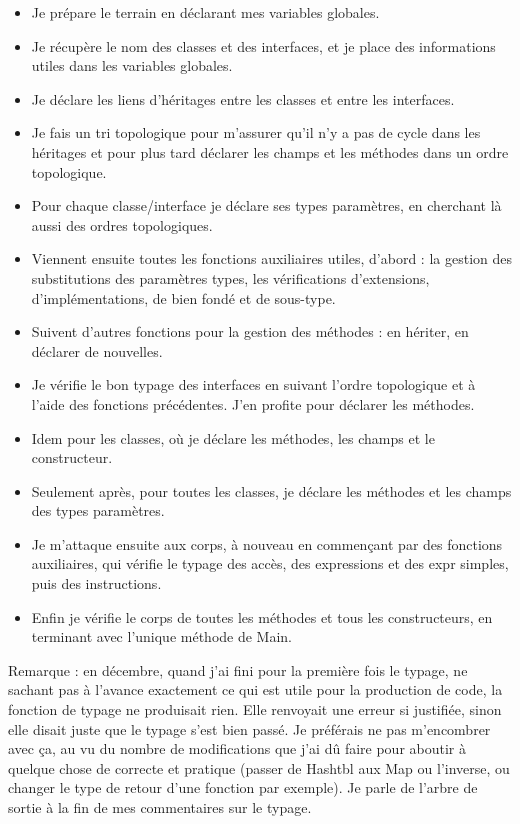 \documentclass[12pt,a4paper]{report}
\begin{document}
\begin{itemize}
\item Je prépare le terrain en déclarant mes variables globales.
\item Je récupère le nom des classes et des interfaces, et je place des informations utiles dans les variables globales.
\item Je déclare les liens d'héritages entre les classes et entre les interfaces.
\item Je fais un tri topologique pour m'assurer qu'il n'y a pas de cycle dans les héritages et pour plus tard déclarer les champs et les méthodes dans un ordre topologique. 
\item Pour chaque classe/interface je déclare ses types paramètres, en cherchant là aussi des ordres topologiques.
\item Viennent ensuite toutes les fonctions auxiliaires utiles, d'abord : la gestion des substitutions des paramètres types, les vérifications d'extensions, d'implémentations, de bien fondé et de sous-type. 
\item Suivent d'autres fonctions pour la gestion des méthodes : en hériter, en déclarer de nouvelles. 
\item Je vérifie le bon typage des interfaces en suivant l'ordre topologique et à l'aide des fonctions précédentes. J'en profite pour déclarer les méthodes.
\item Idem pour les classes, où je déclare les méthodes, les champs et le constructeur.
\item Seulement après, pour toutes les classes, je déclare les méthodes et les champs des types paramètres.
\item Je m'attaque ensuite aux corps, à nouveau en commençant par des fonctions auxiliaires, qui vérifie le typage des accès, des expressions et des expr simples, puis des instructions.
\item Enfin je vérifie le corps de toutes les méthodes et tous les constructeurs, en terminant avec l'unique méthode de Main.
\end{itemize}
Remarque : en décembre, quand j'ai fini pour la première fois le typage, ne sachant pas à l'avance exactement ce qui est utile pour la production de code, la fonction de typage ne produisait rien. Elle renvoyait une erreur si justifiée, sinon elle disait juste que le typage s'est bien passé. Je préférais ne pas m'encombrer avec ça, au vu du nombre de modifications que j'ai dû faire pour aboutir à quelque chose de correcte et pratique (passer de Hashtbl aux Map ou l'inverse, ou changer le type de retour d'une fonction par exemple). Je parle de l'arbre de sortie à la fin de mes commentaires sur le typage. \\ 
\end{document}
